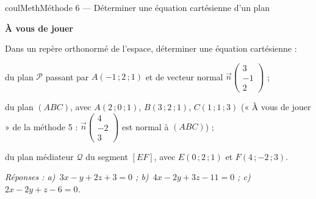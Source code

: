 \documentclass[11pt,a4paper]{article}
\makeatletter
\newcommand{\vect}[1]{\overrightarrow{#1}}
\newcounter{lycee@signet}
\newcommand{\signet}[3][]{\stepcounter{lycee@signet}%
  \edef\lycee@dest{\if\relax\detokenize{#1}\relax
    signet.\arabic{lycee@signet}\else#1\fi}%
  \hypertarget{\lycee@dest}{}\bookmark[level=#2,dest=\lycee@dest]{#3}}
\newcounter{methode}
\newenvironment{methodebox}[1][Méthode]{\stepcounter{methode}%
  \begin{boitecours}[phantom={\signet[methode-\arabic{methode}]{2}{#1}}]{coulMeth}{#1}}%
  {\end{boitecours}}
\newcommand{\etape}[1]{\par\smallskip\textbf{\color{coulMeth}#1}\par\nobreak\smallskip}
\newcommand{\reponse}[1]{\par\smallskip
  {\footnotesize\itshape\color{black!55}Réponses : #1}}
\makeatother
\begin{document}
\begin{methodebox}[Méthode 6 --- Déterminer une équation cartésienne d'un plan]
\etape{À vous de jouer}
Dans un repère orthonormé de l'espace, déterminer une équation cartésienne :
\begin{questions}[label=\alph*)]
  \item du plan $\mathcal{P}$ passant par $A(-1\,;2\,;1)$ et de vecteur normal
        $\vect{n}\begin{pmatrix}3\\-1\\2\end{pmatrix}$ ;
  \item du plan $(ABC)$, avec $A(2\,;0\,;1)$, $B(3\,;2\,;1)$, $C(1\,;1\,;3)$ (« À vous de
        jouer » de la méthode 5 : $\vect{n}\begin{pmatrix}4\\-2\\3\end{pmatrix}$ est normal à $(ABC)$) ;
  \item du plan médiateur $\mathcal{Q}$ du segment $[EF]$, avec $E(0\,;2\,;1)$ et
        $F(4\,;-2\,;3)$.
\end{questions}
\reponse{a)~$3x-y+2z+3=0$ ;\; b)~$4x-2y+3z-11=0$ ;\; c)~$2x-2y+z-6=0$.}
\end{methodebox}
\end{document}
